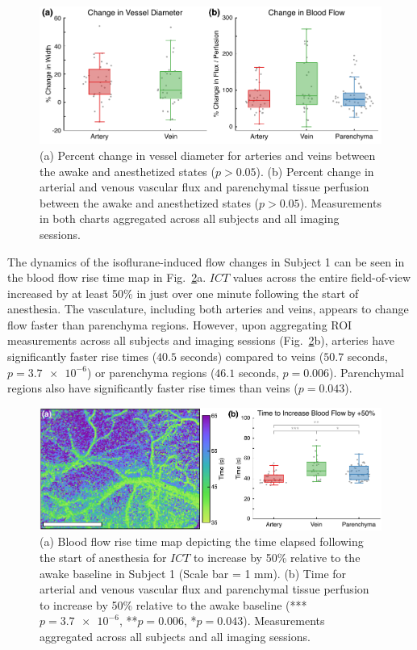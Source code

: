 \documentclass[review]{elsarticle}
\begin{document}
\begin{figure}
    \includegraphics[width=\textwidth]{Figure3.pdf}
    \caption {
        (a) Percent change in vessel diameter for arteries and veins between the awake and anesthetized states ($p > 0.05$). (b) Percent change in arterial and venous vascular flux and parenchymal tissue perfusion between the awake and anesthetized states ($p > 0.05$). Measurements in both charts aggregated across all subjects and all imaging sessions.
    }
    \label{fig:aggregated}
\end{figure}

The dynamics of the isoflurane-induced flow changes in Subject 1 can be seen in the blood flow rise time map in Fig.~\ref{fig:risetime}a. $ICT$ values across the entire field-of-view increased by at least 50\% in just over one minute following the start of anesthesia. The vasculature, including both arteries and veins, appears to change flow faster than parenchyma regions. However, upon aggregating ROI measurements across all subjects and imaging sessions (Fig.~\ref{fig:risetime}b), arteries have significantly faster rise times ($40.5$ seconds) compared to veins ($50.7$ seconds, $p = \num{3.7e-6}$) or parenchyma regions ($46.1$ seconds, $p = 0.006$). Parenchymal regions also have significantly faster rise times than veins ($p = 0.043$). 

\begin{figure}
    \includegraphics[width=\textwidth]{Figure4.pdf}
    \caption {
        (a) Blood flow rise time map depicting the time elapsed following the start of anesthesia for $ICT$ to increase by 50\% relative to the awake baseline in Subject 1 (Scale bar = 1 mm). (b) Time for arterial and venous vascular flux and parenchymal tissue perfusion to increase by 50\% relative to the awake baseline (***$p = \num{3.7e-6}$, **$p = 0.006$, *$p = 0.043$). Measurements aggregated across all subjects and all imaging sessions.
    }
    \label{fig:risetime}
\end{figure}
\end{document}
